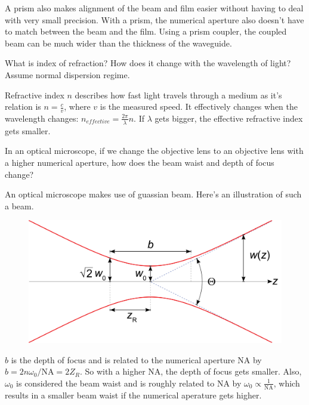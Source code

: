 \documentclass[answers, addpoints]{exam} %
\begin{document}
\begin{questions}
\begin{solution}
		A prism also makes alignment of the beam and film easier without having to deal with very small precision.
		With a prism, the numerical aperture also doesn't have to match between the beam and the film.
		Using a prism coupler, the coupled beam can be much wider than the thickness of the waveguide.
	\end{solution}

	\question[5] What is index of refraction? How does it change with the wavelength of light? Assume normal dispersion regime.
	\begin{solution}
		Refractive index $n$ describes how fast light travels through a medium as it's relation is $n = \frac{c}{v}$, where $v$ is the measured speed.
		It effectively changes when the wavelength changes:
		$n_{effective} = \frac{2\pi}{\lambda} n$.
		If $\lambda$ gets bigger, the effective refractive index gets smaller.
	\end{solution}
	
	\question[5] In an optical microscope, if we change the objective lens to an objective lens with a higher numerical aperture, how does the beam waist and depth of focus change?
	\begin{solution}
		An optical microscope makes use of guassian beam.
		Here's an illustration of such a beam.
		\begin{figure}[H]
			\centering
			\includegraphics[scale=.1]{figures/gaussian}
		\end{figure}
		$b$ is the depth of focus and is related to the numerical aperture $\mathrm{NA}$ by $b=2 n \omega_0 / \mathrm{NA} = 2 Z_R$.
		So with a higher $\mathrm{NA}$, the depth of focus gets smaller.
		Also, $\omega_0$ is considered the beam waist and is roughly related to $\mathrm{NA}$ by $\omega_0 \propto \frac{1}{\mathrm{NA}}$, which results in a smaller beam waist if the numerical aperature gets higher.
	\end{solution}
		

\end{questions}
\end{document}
